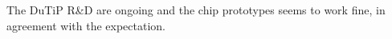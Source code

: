 The DuTiP R\&D are ongoing and the chip prototypes seems to work fine, in agreement with the expectation. 




























\begin{comment}

on \textit{z} direction averaging over incident polar angle

\begin{description}
\item \textbf{Concept}
\end{description}

SOI technology has been chosen as baseline for the new pixel design thanks to its monolithic structure, thinness, low power consumption and low parasitic capacitance. In addition it is resistant aginst neutron and single event upset (SEU\footnote{A Single Event Upset (SEU or SEE, Single Event Error) occurs when a ionizing particle deposits charge close to a storage node (e.g. RAM cell, register) causing a bit value to flip leading to corrupt information. This effect could be mitigated by using, for example, redundant memory. It is not a permanent damage. \label{foo:SEU}}), even though an important issue is TID effect on which efficient solutions have been studied.

When a processed hit signal arrive to the digital part it is stored and one of the timers start to counting down from a starting time set to trigger latency plus one clock, waiting for trigger signal. If the trigger signal is received when the time is 1 (it could be also 2 or 0), the signal is readout as \emph{Current} (\emph{Next} or \emph{Previous} respectively) timing (\emph{PCN timings}). If the trigger is not received at the PCN timings in the pixel, the timer is reset. 

\begin{figure}[h!]
\centering
\subfigure[Analog, Digital and Scan blocks for DuTiP detector.]{\texttt{[image: SOI1]}}\quad
\subfigure[Operational sketch.]{\texttt{[image: SOI2]}}\\
\caption{Schematic of DuTiP circuits.}
\label{SOI}
\end{figure}



\end{comment}
